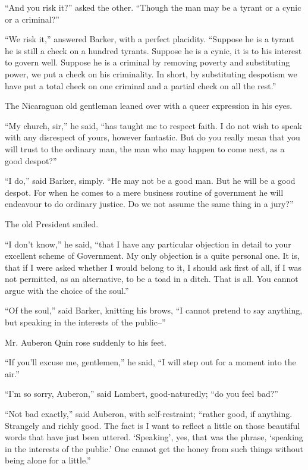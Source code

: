 \documentclass{book}
\begin{document}
“And you risk it?” asked the other. “Though the man may be a tyrant or a cynic or a criminal?”

“We risk it,” answered Barker, with a perfect placidity. “Suppose he is a tyrant he is still a check on a hundred tyrants. Suppose he is a cynic, it is to his interest to govern well. Suppose he is a criminal by removing poverty and substituting power, we put a check on his criminality. In short, by substituting despotism we have put a total check on one criminal and a partial check on all the rest.”

The Nicaraguan old gentleman leaned over with a queer expression in his eyes.

“My church, sir,” he said, “has taught me to respect faith. I do not wish to speak with any disrespect of yours, however fantastic. But do you really mean that you will trust to the ordinary man, the man who may happen to come next, as a good despot?”

“I do,” said Barker, simply. “He may not be a good man. But he will be a good despot. For when he comes to a mere business routine of government he will endeavour to do ordinary justice. Do we not assume the same thing in a jury?”

The old President smiled.

“I don’t know,” he said, “that I have any particular objection in detail to your excellent scheme of Government. My only objection is a quite personal one. It is, that if I were asked whether I would belong to it, I should ask first of all, if I was not permitted, as an alternative, to be a toad in a ditch. That is all. You cannot argue with the choice of the soul.”

“Of the soul,” said Barker, knitting his brows, “I cannot pretend to say anything, but speaking in the interests of the public–”

Mr. Auberon Quin rose suddenly to his feet.

“If you’ll excuse me, gentlemen,” he said, “I will step out for a moment into the air.”

“I’m so sorry, Auberon,” said Lambert, good-naturedly; “do you feel bad?”

“Not bad exactly,” said Auberon, with self-restraint; “rather good, if anything. Strangely and richly good. The fact is I want to reflect a little on those beautiful words that have just been uttered. ‘Speaking’, yes, that was the phrase, ‘speaking in the interests of the public.’ One cannot get the honey from such things without being alone for a little.”
\end{document}
